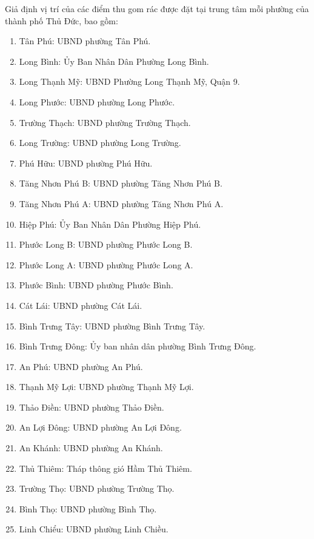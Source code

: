         \quad Giả định vị trí của các điểm thu gom rác được đặt tại trung tâm mỗi phường của thành phố Thủ Đức, bao gồm:
        \begin{enumerate}
            \item Tân Phú: UBND phường Tân Phú.
            \item Long Bình: Ủy Ban Nhân Dân Phường Long Bình.
            \item Long Thạnh Mỹ: UBND Phường Long Thạnh Mỹ, Quận 9.
            \item Long Phước: UBND phường Long Phước.
            \item Trường Thạch: UBND phường Trường Thạch.
            \item Long Trường: UBND phường Long Trường.
            \item Phú Hữu: UBND phường Phú Hữu.
            \item Tăng Nhơn Phú B: UBND phường Tăng Nhơn Phú B.
            \item Tăng Nhơn Phú A: UBND phường Tăng Nhơn Phú A.
            \item Hiệp Phú: Ủy Ban Nhân Dân Phường Hiệp Phú.
            \item Phước Long B: UBND phường Phước Long B.
            \item Phước Long A: UBND phường Phước Long A.
            \item Phước Bình: UBND phường Phước Bình.
            \item Cát Lái: UBND phường Cát Lái.
            \item Bình Trưng Tây: UBND phường Bình Trưng Tây.
            \item Bình Trưng Đông: Ủy ban nhân dân phường Bình Trưng Đông.
            \item An Phú: UBND phường An Phú.
            \item Thạnh Mỹ Lợi: UBND phường Thạnh Mỹ Lợi.
            \item Thảo Điền: UBND phường Thảo Điền.
            \item An Lợi Đông: UBND phường An Lợi Đông.
            \item An Khánh: UBND phường An Khánh.
            \item Thủ Thiêm: Tháp thông gió Hầm Thủ Thiêm.
            \item Trường Thọ: UBND phường Trường Thọ.
            \item Bình Thọ: UBND phường Bình Thọ.
            \item Linh Chiểu: UBND phường Linh Chiều.

\end{enumerate}

